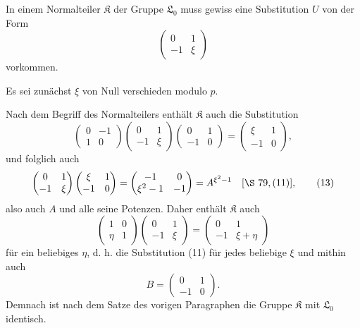 \documentclass[11pt]{article}
\newcommand{\Lzero}{\mathfrak L_0}
\newcommand{\Kgrp}{\mathfrak K}
\begin{document}
In einem Normalteiler $\Kgrp$ der Gruppe $\Lzero$ muss gewiss eine Substitution $U$ von der Form
\begin{equation}
 \begin{pmatrix}0&1\\-1&\xi\end{pmatrix}
\tag{11}
\end{equation}
vorkommen.

Es sei zunächst $\xi$ von Null verschieden modulo $p$.

Nach dem Begriff des Normalteilers enthält $\Kgrp$ auch die Substitution
\begin{equation}
 \begin{pmatrix}0&-1\\1&0\end{pmatrix}
 \begin{pmatrix}0&1\\-1&\xi\end{pmatrix}
 \begin{pmatrix}0&1\\-1&0\end{pmatrix}
 =
 \begin{pmatrix}\xi&1\\-1&0\end{pmatrix},
\tag{12}
\end{equation}
und folglich auch
\begin{equation}
 \begin{pmatrix}0&1\\-1&\xi\end{pmatrix}
 \begin{pmatrix}\xi&1\\-1&0\end{pmatrix}
 =
 \begin{pmatrix}-1&0\\ \xi^2-1&-1\end{pmatrix}
 =A^{\xi^2-1}\quad[\S~79,(11)],
\tag{13}
\end{equation}
also auch $A$ und alle seine Potenzen. Daher enthält $\Kgrp$ auch
\begin{equation}
 \begin{pmatrix}1&0\\ \eta&1\end{pmatrix}
 \begin{pmatrix}0&1\\-1&\xi\end{pmatrix}
 =
 \begin{pmatrix}0&1\\-1&\xi+
\eta\end{pmatrix}
\tag{14}
\end{equation}
für ein beliebiges $\eta$, d. h. die Substitution (11) für jedes beliebige $\xi$ und mithin auch
\[
 B=\begin{pmatrix}0&1\\-1&0\end{pmatrix}.
\]
Demnach ist nach dem Satze des vorigen Paragraphen die Gruppe $\Kgrp$ mit $\Lzero$ identisch.
\end{document}
